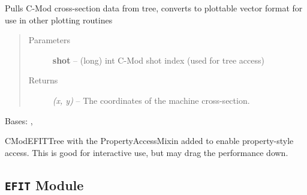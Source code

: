 \documentclass[letterpaper,10pt,english]{sphinxmanual}
\begin{document}
\begin{fulllineitems}
\begin{fulllineitems}
\label{eqtools:eqtools.CModEFIT.CModEFITTree.getMachineCrossSectionFull}
Pulls C-Mod cross-section data from tree, converts to plottable
vector format for use in other plotting routines
\begin{quote}\begin{description}
\item[{Parameters }] \leavevmode
\textbf{shot} --
(long) int
C-Mod shot index (used for tree access)

\item[{Returns}] \leavevmode
\emph{(x, y)} --
The coordinates of the machine cross-section.

\end{description}\end{quote}

\end{fulllineitems}


\end{fulllineitems}


\begin{fulllineitems}
\label{eqtools:eqtools.CModEFIT.CModEFITTreeProp}
Bases: {\hyperref[eqtools:eqtools.CModEFIT.CModEFITTree]{}}, {\hyperref[eqtools:eqtools.core.PropertyAccessMixin]{}}

CModEFITTree with the PropertyAccessMixin added to enable property-style
access. This is good for interactive use, but may drag the performance down.

\end{fulllineitems}



\subsection{\texttt{EFIT} Module}
\label{eqtools:efit-module}\label{eqtools:module-eqtools.EFIT}
\end{document}
